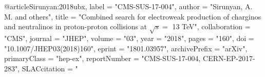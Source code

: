 @article{Sirunyan:2018ubx,
      label          = "CMS-SUS-17-004",
      author         = "Sirunyan, A. M. and others",
      title          = "{Combined search for electroweak production of charginos
                        and neutralinos in proton-proton collisions at $\sqrt{s}
                        =$ 13 TeV}",
      collaboration  = "CMS",
      journal        = "JHEP",
      volume         = "03",
      year           = "2018",
      pages          = "160",
      doi            = "10.1007/JHEP03(2018)160",
      eprint         = "1801.03957",
      archivePrefix  = "arXiv",
      primaryClass   = "hep-ex",
      reportNumber   = "CMS-SUS-17-004, CERN-EP-2017-283",
      SLACcitation   = "%
}

